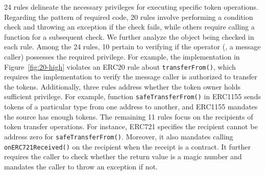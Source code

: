 24 rules delineate the necessary privileges for executing specific token operations. 
%
Regarding the pattern of required code, 
20 rules involve 
performing a condition check and throwing an exception if the check fails, 
while others require calling a function for a subsequent check.
We further analyze the object being checked in each rule. Among the 24 rules,
10 pertain to verifying if the operator (\eg, a message caller) possesses
the required privilege. For example, the implementation in Figure~\ref{fig:20-high}
violates an ERC20 rule about \texttt{transferFrom()}, 
which requires the implementation
to verify the message caller is authorized to
transfer the tokens.
Additionally, three rules address whether the token owner holds sufficient privilege.
For example, function \texttt{safeTransferFrom()} 
in ERC1155 
sends tokens of a particular type from one address to another, 
and ERC1155 mandates the source has enough tokens. 
The remaining 11 rules focus on the recipients of token transfer operations. 
For instance, ERC721 specifies the recipient cannot be address zero for \texttt{safeTransferFrom()}. 
Moreover,
it also mandates calling \texttt{onERC721Received()} on the recipient when the receipt is
a contract. 
It further requires the caller to check whether the return value 
is a magic number and mandates the caller
to 
throw an exception if not. 








